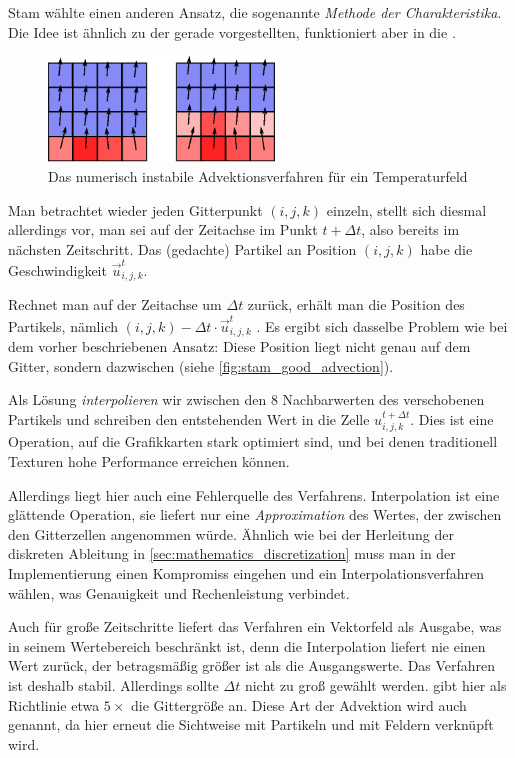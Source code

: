 Stam wählte einen anderen Ansatz, die sogenannte \emph{Methode der
Charakteristika}. Die Idee ist ähnlich zu der gerade vorgestellten, funktioniert
aber in die .

\begin{figure}[ht]
\centering
\includegraphics[width=6cm]{images/advection_bad_example}
\caption{Das numerisch instabile Advektionsverfahren für ein Temperaturfeld}
\end{figure}

Man betrachtet wieder jeden Gitterpunkt $(i,j,k)$ einzeln, stellt sich diesmal
allerdings vor, man sei auf der Zeitachse im Punkt $t+\Delta t$, also bereits im
nächsten Zeitschritt. Das (gedachte) Partikel an Position $(i,j,k)$ habe die
Geschwindigkeit $\vec{u}_{i,j,k}^t$.

Rechnet man auf der Zeitachse um $\Delta t$ zurück, erhält man die
 Position des Partikels, nämlich $(i,j,k) -
\Delta t \cdot \vec{u}_{i,j,k}^t$ . Es ergibt sich dasselbe Problem wie bei
dem vorher beschriebenen Ansatz: Diese Position liegt nicht genau auf
dem Gitter, sondern dazwischen (siehe
\autoref{fig:stam_good_advection}).

Als Lösung \emph{interpolieren} wir zwischen den 8 Nachbarwerten des
verschobenen Partikels und schreiben den entstehenden Wert in die Zelle
$u_{i,j,k}^{t+\Delta t}$. Dies ist eine Operation, auf die Grafikkarten stark
optimiert sind, und bei denen traditionell Texturen hohe Performance erreichen
können.

Allerdings liegt hier auch eine Fehlerquelle des Verfahrens. Interpolation ist
eine glättende Operation, sie liefert nur eine \emph{Approximation} des Wertes,
der zwischen den Gitterzellen angenommen würde. Ähnlich wie bei der
Herleitung der diskreten Ableitung in \autoref{sec:mathematics_discretization}
muss man in der Implementierung einen Kompromiss eingehen und ein
Interpolationsverfahren wählen, was Genauigkeit und Rechenleistung verbindet.

Auch für große Zeitschritte liefert das Verfahren ein Vektorfeld als Ausgabe,
was in seinem Wertebereich beschränkt ist, denn die Interpolation liefert nie einen
Wert zurück, der betragsmäßig größer ist als die Ausgangswerte. Das Verfahren
ist deshalb stabil. Allerdings sollte $\Delta t$ nicht zu groß gewählt werden.
\cite{Foster} gibt hier als Richtlinie etwa $5\times$ die Gittergröße
an. Diese Art der Advektion wird auch
 genannt, da hier erneut
die Sichtweise mit Partikeln und mit Feldern verknüpft wird.

